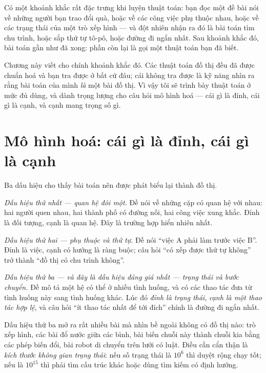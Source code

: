 \documentclass[../../algorithm.tex]{subfiles}
\begin{document}
Có một khoảnh khắc rất đặc trưng khi luyện thuật toán: bạn đọc một đề bài nói về những người bạn trao đổi quà, hoặc về các công việc phụ thuộc nhau, hoặc về các trạng thái của một trò xếp hình --- và đột nhiên nhận ra đó là bài toán tìm chu trình, hoặc sắp thứ tự tô-pô, hoặc đường đi ngắn nhất. Sau khoảnh khắc đó, bài toán gần như đã xong: phần còn lại là gọi một thuật toán bạn đã biết.

Chương này viết cho chính khoảnh khắc đó. Các thuật toán đồ thị đều đã được chuẩn hoá và bạn tra được ở bất cứ đâu; cái không tra được là kỹ năng nhìn ra rằng bài toán của mình \emph{là} một bài đồ thị. Vì vậy tôi sẽ trình bày thuật toán ở mức đủ dùng, và dành trọng lượng cho câu hỏi mô hình hoá --- cái gì là đỉnh, cái gì là cạnh, và cạnh mang trọng số gì.

\section{Mô hình hoá: cái gì là đỉnh, cái gì là cạnh}

Ba dấu hiệu cho thấy bài toán nên được phát biểu lại thành đồ thị.

\emph{Dấu hiệu thứ nhất --- quan hệ đôi một.} Đề nói về những cặp có quan hệ với nhau: hai người quen nhau, hai thành phố có đường nối, hai công việc xung khắc. Đỉnh là đối tượng, cạnh là quan hệ. Đây là trường hợp hiển nhiên nhất.

\emph{Dấu hiệu thứ hai --- phụ thuộc và thứ tự.} Đề nói ``việc A phải làm trước việc B''. Đỉnh là việc, cạnh có hướng là ràng buộc; câu hỏi ``có xếp được thứ tự không'' trở thành ``đồ thị có chu trình không''.

\emph{Dấu hiệu thứ ba --- và đây là dấu hiệu đáng giá nhất --- \emph{trạng thái và bước chuyển}.} Đề mô tả một hệ có thể ở nhiều tình huống, và có các thao tác đưa từ tình huống này sang tình huống khác. Lúc đó \emph{đỉnh là trạng thái}, \emph{cạnh là một thao tác hợp lệ}, và câu hỏi ``ít thao tác nhất để tới đích'' chính là đường đi ngắn nhất.

Dấu hiệu thứ ba mở ra rất nhiều bài mà nhìn bề ngoài không có đồ thị nào: trò xếp hình, các bài đổ nước giữa các bình, bài biến chuỗi này thành chuỗi kia bằng các phép biến đổi, bài robot di chuyển trên lưới có luật. Điều cần cẩn thận là \emph{kích thước không gian trạng thái}: nếu số trạng thái là \(10^6\) thì duyệt rộng chạy tốt; nếu là \(10^{15}\) thì phải tìm cấu trúc khác hoặc dùng tìm kiếm có định hướng.
\end{document}
